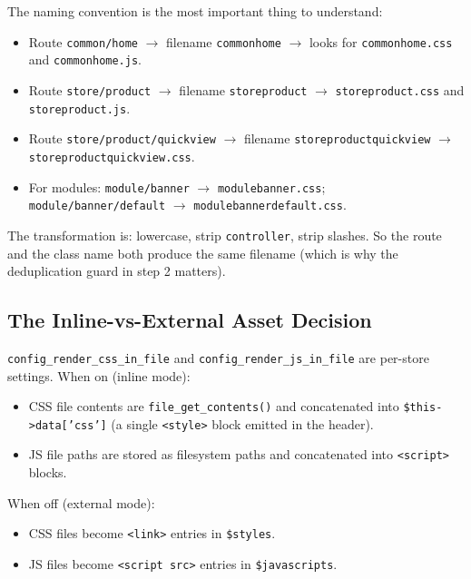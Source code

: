 \documentclass[11pt,a4paper]{article}
\begin{document}
The naming convention is the most important thing to understand:

\begin{itemize}[leftmargin=1.6em,itemsep=2pt]
  \item Route \texttt{common/home} $\to$ filename \texttt{commonhome} $\to$
        looks for \texttt{commonhome.css} and \texttt{commonhome.js}.
  \item Route \texttt{store/product} $\to$ filename \texttt{storeproduct}
        $\to$ \texttt{storeproduct.css} and \texttt{storeproduct.js}.
  \item Route \texttt{store/product/quickview} $\to$ filename
        \texttt{storeproductquickview} $\to$
        \texttt{storeproductquickview.css}.
  \item For modules: \texttt{module/banner} $\to$
        \texttt{modulebanner.css}; \texttt{module/banner/default}
        $\to$ \texttt{modulebannerdefault.css}.
\end{itemize}

The transformation is: lowercase, strip \texttt{controller}, strip
slashes. So the route and the class name both produce the same
filename (which is why the deduplication guard in step 2 matters).

\subsection{The Inline-vs-External Asset Decision}

\texttt{config\_render\_css\_in\_file} and
\texttt{config\_render\_js\_in\_file} are per-store settings. When
on (inline mode):

\begin{itemize}[leftmargin=1.6em,itemsep=2pt]
  \item CSS file contents are \texttt{file\_get\_contents()} and
        concatenated into \texttt{\$this->data['css']} (a single
        \texttt{<style>} block emitted in the header).
  \item JS file paths are stored as filesystem paths and
        concatenated into \texttt{<script>} blocks.
\end{itemize}

When off (external mode):

\begin{itemize}[leftmargin=1.6em,itemsep=2pt]
  \item CSS files become \texttt{<link>} entries in \texttt{\$styles}.
  \item JS files become \texttt{<script src>} entries in
        \texttt{\$javascripts}.
\end{itemize}
\end{document}
